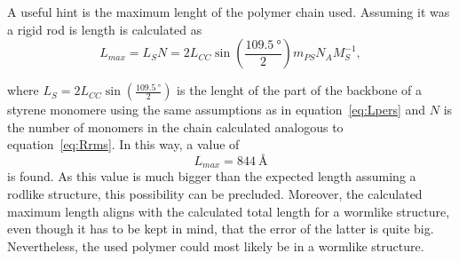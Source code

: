 A useful hint is the maximum lenght of the polymer chain used. Assuming it was a rigid rod is length is calculated as 
\begin{equation}
    L_{max} = L_S N = 2 L_{CC} \sin(\frac{\SI{109.5}{\degree}}{2}) m_{PS} N_A M_S^{-1}, 
\end{equation}

where $L_S = 2 L_{CC} \sin(\frac{\SI{109.5}{\degree}}{2})$ is the lenght of the part of the backbone of a styrene monomere using the same assumptions as in equation~\ref{eq:Lpers} and $N$ is the number of monomers in the chain calculated analogous to equation~\ref{eq:Rrms}. In this way, a value of 
\begin{equation}
    L_{max} = \SI{844}{\angstrom} 
\end{equation}
is found. As this value is much bigger than the expected length assuming a rodlike structure, this possibility can be precluded. Moreover, the calculated maximum length aligns with the calculated total length for a wormlike structure, even though it has to be kept in mind, that the error of the latter is quite big. Nevertheless, the used polymer could most likely be in a wormlike structure.